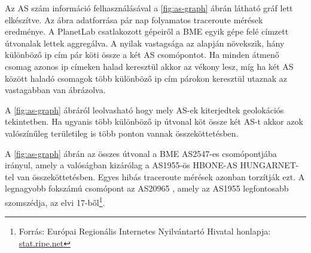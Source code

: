 Az AS szám információ felhasználásával a \ref{fig:as-graph} ábrán látható gráf lett elkészítve. Az ábra adatforrása pár nap folyamatos traceroute mérések eredménye. A PlanetLab csatlakozott gépeiről a BME egyik gépe felé címzett útvonalak lettek aggregálva. A nyilak vastagsága az alapján növekszik, hány különböző ip cím pár köti össze a két AS csomópontot. Ha minden átmenő csomag azonos ip címeken halad keresztül akkor az vékony lesz, míg ha két AS között haladó csomagok több különböző ip cím párokon keresztül utaznak az vastagabban van ábrázolva.

A \ref{fig:as-graph} ábráról leolvasható hogy mely AS-ek kiterjedtek geolokációs tekintetben. Ha ugyanis több különböző ip útvonal köt össze két AS-t akkor azok valószínűleg területileg is több ponton vannak összeköttetésben.

A \ref{fig:as-graph} ábrán az összes útvonal a BME AS2547-es csomópontjába irányul, amely a valóságban kizárólag a AS1955-ös HBONE-AS HUNGARNET-tel van összeköttetésben. Egyes hibás traceroute mérések azonban torzítják ezt. A legnagyobb fokszámú csomópont az AS20965 , amely az AS1955 legfontosabb szomszédja, az elvi 17-ből\footnote{Forrás: Európai Regionális Internetes Nyilvántartó Hivatal honlapja: \href{https://stat.ripe.net/widget/asn-neighbours\#w.resource=1955}{stat.ripe.net}}.